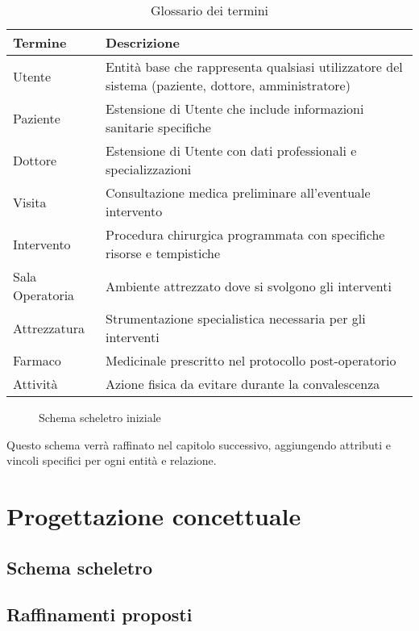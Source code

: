 \documentclass[12pt,a4paper]{report}
\begin{document}
\begin{table}[H]
\caption{Glossario dei termini}
\begin{tabular}{p{3cm}p{12cm}}
\toprule
\textbf{Termine} & \textbf{Descrizione} \\
\midrule
Utente & Entità base che rappresenta qualsiasi utilizzatore del sistema (paziente, dottore, amministratore) \\
Paziente & Estensione di Utente che include informazioni sanitarie specifiche \\
Dottore & Estensione di Utente con dati professionali e specializzazioni \\
Visita & Consultazione medica preliminare all'eventuale intervento \\
Intervento & Procedura chirurgica programmata con specifiche risorse e tempistiche \\
Sala Operatoria & Ambiente attrezzato dove si svolgono gli interventi \\
Attrezzatura & Strumentazione specialistica necessaria per gli interventi \\
Farmaco & Medicinale prescritto nel protocollo post-operatorio \\
Attività & Azione fisica da evitare durante la convalescenza \\
\bottomrule
\end{tabular}
\end{table}

\begin{figure}[H]
\caption{Schema scheletro iniziale}
\centering
\end{figure}

Questo schema verrà raffinato nel capitolo successivo, aggiungendo attributi e vincoli specifici per ogni entità e relazione.

\chapter{Progettazione concettuale} 
\section{Schema scheletro}
\section{Raffinamenti proposti}
\end{document}
